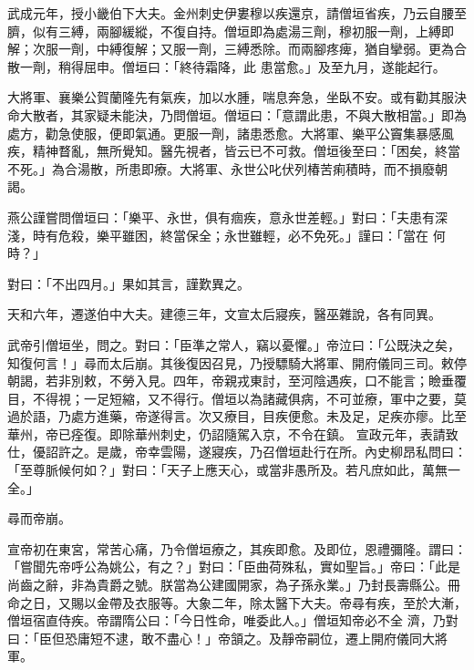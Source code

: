 \begin{pinyinscope}
 武成元年，授小畿伯下大夫。金州刺史伊婁穆以疾還京，請僧垣省疾，乃云自腰至臍，似有三縛，兩腳緩縱，不復自持。僧垣即為處湯三劑，穆初服一劑，上縛即解；次服一劑，中縛復解；又服一劑，三縛悉除。而兩腳疼痺，猶自攣弱。更為合散一劑，稍得屈申。僧垣曰：「終待霜降，此
 患當愈。」及至九月，遂能起行。



 大將軍、襄樂公賀蘭隆先有氣疾，加以水腫，喘息奔急，坐臥不安。或有勸其服決命大散者，其家疑未能決，乃問僧垣。僧垣曰：「意謂此患，不與大散相當。」即為處方，勸急使服，便即氣通。更服一劑，諸患悉愈。大將軍、樂平公竇集暴感風疾，精神瞀亂，無所覺知。醫先視者，皆云已不可救。僧垣後至曰：「困矣，終當不死。」為合湯散，所患即療。大將軍、永世公叱伏列椿苦痢積時，而不損廢朝謁。



 燕公謹嘗問僧垣曰：「樂平、永世，俱有痼疾，意永世差輕。」對曰：「夫患有深淺，時有危殺，樂平雖困，終當保全；永世雖輕，必不免死。」謹曰：「當在
 何時？」



 對曰：「不出四月。」果如其言，謹歎異之。



 天和六年，遷遂伯中大夫。建德三年，文宣太后寢疾，醫巫雜說，各有同異。



 武帝引僧垣坐，問之。對曰：「臣準之常人，竊以憂懼。」帝泣曰：「公既決之矣，知復何言！」尋而太后崩。其後復因召見，乃授驃騎大將軍、開府儀同三司。敕停朝謁，若非別敕，不勞入見。四年，帝親戎東討，至河陰遇疾，口不能言；瞼垂覆目，不得視；一足短縮，又不得行。僧垣以為諸藏俱病，不可並療，軍中之要，莫過於語，乃處方進藥，帝遂得言。次又療目，目疾便愈。未及足，足疾亦瘳。比至華州，帝已痊復。即除華州刺史，仍詔隨駕入京，不令在鎮。
 宣政元年，表請致仕，優詔許之。是歲，帝幸雲陽，遂寢疾，乃召僧垣赴行在所。內史柳昂私問曰：「至尊脈候何如？」對曰：「天子上應天心，或當非愚所及。若凡庶如此，萬無一全。」



 尋而帝崩。



 宣帝初在東宮，常苦心痛，乃令僧垣療之，其疾即愈。及即位，恩禮彌隆。謂曰：「嘗聞先帝呼公為姚公，有之？」對曰：「臣曲荷殊私，實如聖旨。」帝曰：「此是尚齒之辭，非為貴爵之號。朕當為公建國開家，為子孫永業。」乃封長壽縣公。冊命之日，又賜以金帶及衣服等。大象二年，除太醫下大夫。帝尋有疾，至於大漸，僧垣宿直侍疾。帝謂隋公曰：「今日性命，唯委此人。」僧垣知帝必不全
 濟，乃對曰：「臣但恐庸短不逮，敢不盡心！」帝頷之。及靜帝嗣位，遷上開府儀同大將軍。




\end{pinyinscope}

